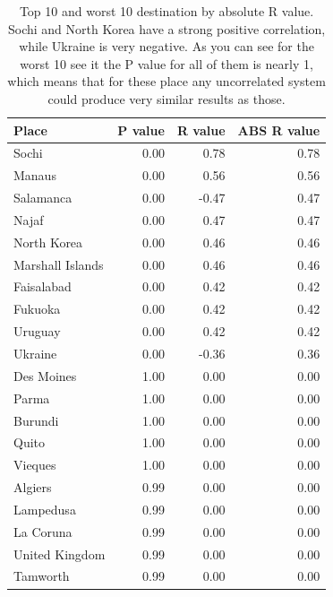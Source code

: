 \documentclass[minf,twoside,singlespacing,parskip,frontabs,notimes,11pt]{infthesis}
\begin{document}
\begin{table}[p!]
\begin{center}
\begin{tabular}{ l | r | r | r}
\textbf{Place} & \textbf{P value} & \textbf{R value} & \textbf{ABS R value}\\
\hline
Sochi & 0.00 & 0.78 & 0.78\\
Manaus & 0.00 & 0.56 & 0.56\\
Salamanca & 0.00 & -0.47 & 0.47\\
Najaf & 0.00 & 0.47 & 0.47\\
North Korea & 0.00 & 0.46 & 0.46\\
Marshall Islands & 0.00 & 0.46 & 0.46\\
Faisalabad & 0.00 & 0.42 & 0.42\\
Fukuoka & 0.00 & 0.42 & 0.42\\
Uruguay & 0.00 & 0.42 & 0.42\\
Ukraine & 0.00 & -0.36 & 0.36 \\
\hline
\hline
Des Moines & 1.00 & 0.00 & 0.00\\
Parma & 1.00 & 0.00 & 0.00\\
Burundi & 1.00 & 0.00 & 0.00\\
Quito & 1.00 & 0.00 & 0.00\\
Vieques & 1.00 & 0.00 & 0.00\\
Algiers & 0.99 & 0.00 & 0.00\\
Lampedusa & 0.99 & 0.00 & 0.00\\
La Coruna & 0.99 & 0.00 & 0.00\\
United Kingdom & 0.99 & 0.00 & 0.00\\
Tamworth & 0.99 & 0.00 & 0.00\\
\end{tabular}
\end{center}
\caption{Top 10 and worst 10 destination by absolute R value. Sochi and North Korea have a strong positive correlation, while Ukraine is very negative. As you can see for the worst 10 see it the P value for all of them is nearly 1, which means that for these place any uncorrelated system could produce very similar results as those. }
\label{r-values}
\end{table}
\end{document}
